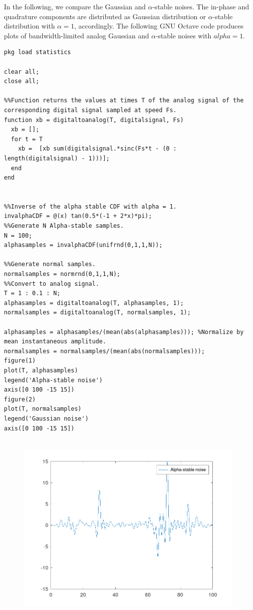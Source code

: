 \documentclass{article}
\begin{document}
In the following, we compare the Gaussian and $\alpha$-stable noises. The in-phase and quadrature components are distributed as Gaussian distribution or $\alpha$-stable distribution with $\alpha =1$, accordingly. The following GNU Octave code produces plots of bandwidth-limited analog Gaussian and  $\alpha$-stable noises with $alpha = 1$. 

\begin{verbatim}
pkg load statistics

clear all;
close all;

%%Function returns the values at times T of the analog signal of the corresponding digital signal sampled at speed Fs.
function xb = digitaltoanalog(T, digitalsignal, Fs)
  xb = [];
  for t = T
    xb =  [xb sum(digitalsignal.*sinc(Fs*t - (0 : length(digitalsignal) - 1)))];
  end
end


%%Inverse of the alpha stable CDF with alpha = 1.
invalphaCDF = @(x) tan(0.5*(-1 + 2*x)*pi);
%%Generate N Alpha-stable samples.
N = 100;
alphasamples = invalphaCDF(unifrnd(0,1,1,N));

%%Generate normal samples.
normalsamples = normrnd(0,1,1,N);
%%Convert to analog signal.
T = 1 : 0.1 : N;
alphasamples = digitaltoanalog(T, alphasamples, 1);
normalsamples = digitaltoanalog(T, normalsamples, 1);

alphasamples = alphasamples/(mean(abs(alphasamples))); %Normalize by mean instantaneous amplitude.
normalsamples = normalsamples/(mean(abs(normalsamples)));
figure(1)
plot(T, alphasamples)
legend('Alpha-stable noise')
axis([0 100 -15 15])
figure(2)
plot(T, normalsamples)
legend('Gaussian noise')
axis([0 100 -15 15])


\end{verbatim}

\begin{figure}
  \includegraphics[width=\linewidth]{alphastablenoise.png}
\end{figure}
\end{document}
